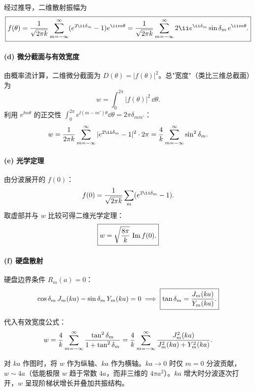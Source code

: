 \begin{solution}
经过推导，二维散射振幅为
\[
\boxed{f(\theta)={1\over\sqrt{2\pi k}}\sum_{m=-\infty}^{\infty}(e^{2\ii\delta_m}-1)e^{\ii m\theta}
={1\over\sqrt{2\pi k}}\sum_{m=-\infty}^{\infty}2\ii e^{\ii\delta_m}\sin\delta_m\,e^{\ii m\theta}.}
\]

\paragraph{(d) 微分截面与有效宽度}

由概率流计算，二维微分截面为 $D(\theta)=|f(\theta)|^2$。总"宽度"（类比三维总截面）为
\[
w=\int_0^{2\pi}|f(\theta)|^2\,\dd\theta.
\]
利用 $e^{\ii m\theta}$ 的正交性 $\int_0^{2\pi}e^{\ii(m-m')\theta}\dd\theta=2\pi\delta_{mm'}$：
\[
w={1\over2\pi k}\sum_{m=-\infty}^{\infty}|e^{2\ii\delta_m}-1|^2\cdot2\pi
={4\over k}\sum_{m=-\infty}^{\infty}\sin^2\delta_m.
\]

\paragraph{(e) 光学定理}

由分波展开的 $f(0)$：
\[
f(0)={1\over\sqrt{2\pi k}}\sum_m(e^{2\ii\delta_m}-1).
\]
取虚部并与 $w$ 比较可得二维光学定理：
\[
\boxed{w=\sqrt{8\pi\over k}\,\operatorname{Im}f(0).}
\]

\paragraph{(f) 硬盘散射}

硬盘边界条件 $R_m(a)=0$：
\[
\cos\delta_m\,J_m(ka)-\sin\delta_m\,Y_m(ka)=0
\;\Longrightarrow\;
\boxed{\tan\delta_m={J_m(ka)\over Y_m(ka)}.}
\]

代入有效宽度公式：
\[
w={4\over k}\sum_{m=-\infty}^{\infty}{\tan^2\delta_m\over1+\tan^2\delta_m}
={4\over k}\sum_{m=-\infty}^{\infty}{J_m^2(ka)\over J_m^2(ka)+Y_m^2(ka)}.
\]

对 $ka$ 作图时，将 $w$ 作为纵轴、$ka$ 作为横轴。$ka\to0$ 时仅 $m=0$ 分波贡献，$w\sim4a$（低能极限 $w$ 趋于常数 $4a$，而非三维的 $4\pi a^2$）。$ka$ 增大时分波逐次打开，$w$ 呈现阶梯状增长并叠加共振结构。
\end{solution}

